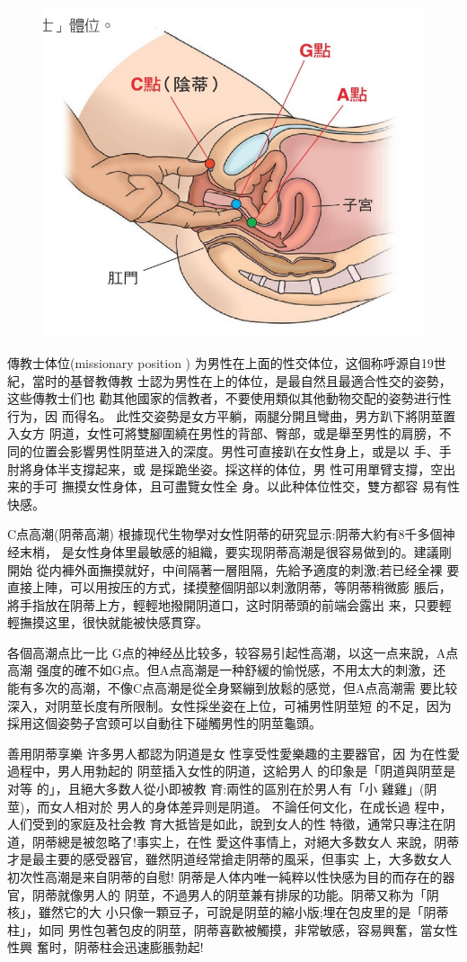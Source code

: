 \documentclass[12pt,UTF8]{ctexbook}
\begin{document}
\begin{figure}[htbp]
	\centering
	\includegraphics[width=0.7\linewidth]{16}
	\caption{}
	\label{fig:1}
\end{figure}

傳教士体位(missionary position )
为男性在上面的性交体位，这個称呼源自19世紀，當时的基督教傳教
士認为男性在上的体位，是最自然且最適合性交的姿勢，这些傳教士们也
勸其他國家的信教者，不要使用類似其他動物交配的姿勢进行性行为，因
而得名。
此性交姿勢是女方平躺，兩腿分開且彎曲，男方趴下將阴莖置入女方
阴道，女性可將雙腳圍繞在男性的背部、臀部，或是舉至男性的肩膀，不
同的位置会影響男性阴莖进入的深度。男性可直接趴在女性身上，或是以
手、手肘將身体半支撐起来，或
是採跪坐姿。採这样的体位，男
性可用單臂支撐，空出来的手可
撫摸女性身体，且可盡覽女性全
身。以此种体位性交，雙方都容
易有性快感。

C点高潮(阴蒂高潮)
根據现代生物學对女性阴蒂的研究显示:阴蒂大約有8千多個神经末梢，
是女性身体里最敏感的組織，要实现阴蒂高潮是很容易做到的。建議剛開始
從内褲外面撫摸就好，中间隔著一層阻隔，先給予適度的刺激;若已经全裸
要直接上陣，可以用按压的方式，揉摸整個阴部以刺激阴蒂，等阴蒂稍微膨
脹后，將手指放在阴蒂上方，輕輕地撥開阴道口，这时阴蒂頭的前端会露出
来，只要輕輕撫摸这里，很快就能被快感貫穿。

各個高潮点比一比
G点的神经丛比较多，较容易引起性高潮，以这一点来說，A点高潮
强度的確不如G点。但A点高潮是一种舒緩的愉悦感，不用太大的刺激，还
能有多次的高潮，不像C点高潮是從全身緊繃到放鬆的感觉，但A点高潮需
要比较深入，对阴莖长度有所限制。女性採坐姿在上位，可補男性阴莖短
的不足，因为採用这個姿勢子宫颈可以自動往下碰觸男性的阴莖龜頭。

善用阴蒂享樂
许多男人都認为阴道是女
性享受性愛樂趣的主要器官，因
为在性愛過程中，男人用勃起的
阴莖插入女性的阴道，这給男人
的印象是「阴道與阴莖是对等
的」，且絕大多数人從小即被教
育:兩性的區別在於男人有「小
雞雞」(阴莖)，而女人相对於
男人的身体差异则是阴道。
不論任何文化，在成长過
程中，人们受到的家庭及社会教
育大抵皆是如此，說到女人的性
特徵，通常只專注在阴道，阴蒂總是被忽略了!事实上，在性
愛这件事情上，对絕大多数女人
来說，阴蒂才是最主要的感受器官，雖然阴道经常搶走阴蒂的風采，但事实
上，大多数女人初次性高潮是来自阴蒂的自慰!
阴蒂是人体内唯一純粹以性快感为目的而存在的器官，阴蒂就像男人的
阴莖，不過男人的阴莖兼有排尿的功能。阴蒂又称为「阴核」，雖然它的大
小只像一顆豆子，可說是阴莖的縮小版;埋在包皮里的是「阴蒂柱」，如同
男性包著包皮的阴莖，阴蒂喜歡被觸摸，非常敏感，容易興奮，當女性性興
奮时，阴蒂柱会迅速膨脹勃起!
\end{document}
